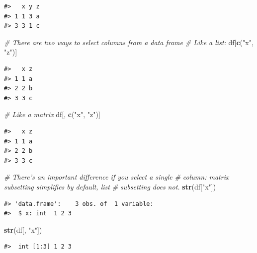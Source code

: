 \documentclass[]{book}
\newenvironment{Shaded}{\begin{snugshade}}{\end{snugshade}}
\newcommand{\KeywordTok}[1]{\textcolor[rgb]{0.13,0.29,0.53}{\textbf{#1}}}
\newcommand{\StringTok}[1]{\textcolor[rgb]{0.31,0.60,0.02}{#1}}
\newcommand{\CommentTok}[1]{\textcolor[rgb]{0.56,0.35,0.01}{\textit{#1}}}
\newcommand{\NormalTok}[1]{#1}
\theoremstyle{definition}
\theoremstyle{definition}
\theoremstyle{definition}
\theoremstyle{remark}
\begin{document}
\begin{verbatim}
#>   x y z
#> 1 1 3 a
#> 3 3 1 c
\end{verbatim}

\begin{Shaded}
\begin{Highlighting}[]
\CommentTok{# There are two ways to select columns from a data frame}
\CommentTok{# Like a list:}
\NormalTok{df[}\KeywordTok{c}\NormalTok{(}\StringTok{"x"}\NormalTok{, }\StringTok{"z"}\NormalTok{)]}
\end{Highlighting}
\end{Shaded}

\begin{verbatim}
#>   x z
#> 1 1 a
#> 2 2 b
#> 3 3 c
\end{verbatim}

\begin{Shaded}
\begin{Highlighting}[]
\CommentTok{# Like a matrix}
\NormalTok{df[, }\KeywordTok{c}\NormalTok{(}\StringTok{"x"}\NormalTok{, }\StringTok{"z"}\NormalTok{)]}
\end{Highlighting}
\end{Shaded}

\begin{verbatim}
#>   x z
#> 1 1 a
#> 2 2 b
#> 3 3 c
\end{verbatim}

\begin{Shaded}
\begin{Highlighting}[]
\CommentTok{# There's an important difference if you select a single }
\CommentTok{# column: matrix subsetting simplifies by default, list }
\CommentTok{# subsetting does not.}
\KeywordTok{str}\NormalTok{(df[}\StringTok{"x"}\NormalTok{])}
\end{Highlighting}
\end{Shaded}

\begin{verbatim}
#> 'data.frame':    3 obs. of  1 variable:
#>  $ x: int  1 2 3
\end{verbatim}

\begin{Shaded}
\begin{Highlighting}[]
\KeywordTok{str}\NormalTok{(df[, }\StringTok{"x"}\NormalTok{])}
\end{Highlighting}
\end{Shaded}

\begin{verbatim}
#>  int [1:3] 1 2 3
\end{verbatim}
\end{document}
